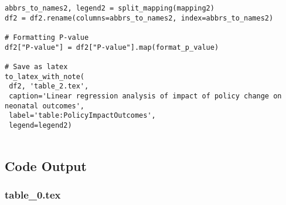 \documentclass[11pt]{article}
\begin{document}
\begin{verbatim}
abbrs_to_names2, legend2 = split_mapping(mapping2)
df2 = df2.rename(columns=abbrs_to_names2, index=abbrs_to_names2)

# Formatting P-value
df2["P-value"] = df2["P-value"].map(format_p_value)

# Save as latex
to_latex_with_note(
 df2, 'table_2.tex',
 caption='Linear regression analysis of impact of policy change on neonatal outcomes', 
 label='table:PolicyImpactOutcomes',
 legend=legend2)


\end{verbatim}



\subsection{Code Output}

\subsubsection*{table\_0.tex}
\end{document}
